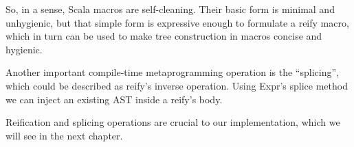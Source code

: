 So, in a sense, Scala macros are self-cleaning. Their basic form is minimal
and unhygienic, but that simple form is expressive enough to formulate a
reify macro, which in turn can be used to make tree construction in macros
concise and hygienic.

Another important compile-time metaprogramming operation is the ``splicing'',
which could be described as reify's inverse operation. Using Expr's splice
method we can inject an existing AST inside a reify's body.

Reification and splicing operations are crucial to our implementation, which we
will see in the next chapter.